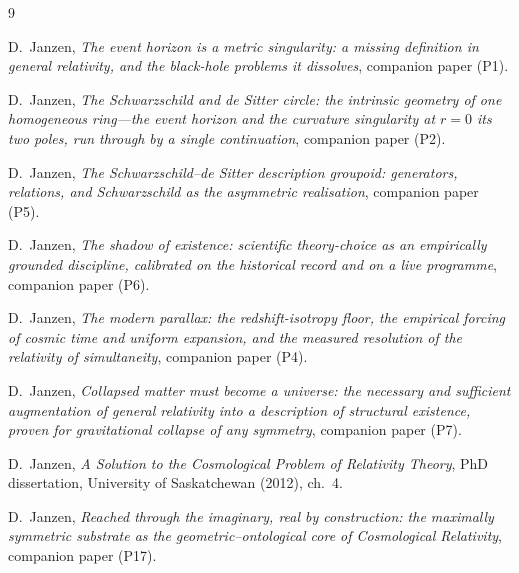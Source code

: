 \documentclass[11pt,a4paper]{article}
\theoremstyle{definition}
\begin{document}
\begin{thebibliography}{9}

D.~Janzen,
\emph{The event horizon is a metric singularity: a missing definition in general relativity, and the black-hole problems it dissolves}, companion paper (P1).

D.~Janzen,
\emph{The Schwarzschild and de Sitter circle: the intrinsic geometry of one homogeneous ring---the event horizon and the curvature singularity at $r=0$ its two poles, run through by a single continuation}, companion paper (P2).

D.~Janzen,
\emph{The Schwarzschild--de Sitter description groupoid: generators, relations, and Schwarzschild as the asymmetric realisation}, companion paper (P5).

D.~Janzen,
\emph{The shadow of existence: scientific theory-choice as an empirically grounded discipline, calibrated on the historical record and on a live programme}, companion paper (P6).

D.~Janzen,
\emph{The modern parallax: the redshift-isotropy floor, the empirical forcing of cosmic time and uniform expansion, and the measured resolution of the relativity of simultaneity}, companion paper (P4).

 D.~Janzen, \emph{Collapsed matter must become a universe: the necessary and sufficient augmentation of general relativity into a description of structural existence, proven for gravitational collapse of any symmetry}, companion paper (P7).

 D.~Janzen, \emph{A Solution to the Cosmological Problem of Relativity Theory}, PhD dissertation, University of Saskatchewan (2012), ch.~4.

 D.~Janzen, \emph{Reached through the imaginary, real by construction: the maximally symmetric substrate as the geometric--ontological core of Cosmological Relativity}, companion paper (P17).


\end{thebibliography}
\end{document}
